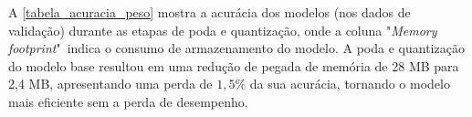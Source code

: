 A \autoref{tabela_acuracia_peso} mostra a acurácia dos modelos (nos dados de validação) durante as etapas de poda e
quantização, onde a coluna "\textit{Memory footprint}"\  indica o consumo de armazenamento do modelo.
A poda e quantização do modelo base resultou em uma redução de pegada de memória de 28 MB para 2,4 MB, apresentando uma perda
de $1,5\%$ da sua acurácia, tornando o modelo mais eficiente sem a perda de desempenho.
